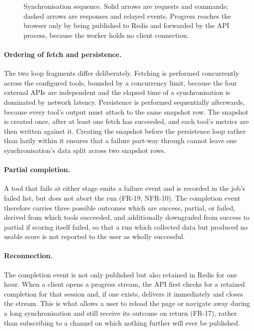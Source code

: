 \begin{figure}[htbp]
\caption{Synchronisation sequence. Solid arrows are requests and commands; dashed
arrows are responses and relayed events. Progress reaches the browser only by
being published to Redis and forwarded by the API process, because the worker
holds no client connection.}
\label{fig:sync-sequence}
\end{figure}

\paragraph{Ordering of fetch and persistence.}
The two loop fragments differ deliberately. Fetching is performed concurrently
across the configured tools, bounded by a concurrency limit, because the four
external APIs are independent and the elapsed time of a synchronisation is
dominated by network latency. Persistence is performed sequentially afterwards,
because every tool's output must attach to the same snapshot row. The snapshot is
created once, after at least one fetch has succeeded, and each tool's metrics are
then written against it. Creating the snapshot before the persistence loop rather
than lazily within it ensures that a failure part-way through cannot leave one
synchronisation's data split across two snapshot rows.

\paragraph{Partial completion.}
A tool that fails at either stage emits a failure event and is recorded in the
job's failed list, but does not abort the run (FR-19, NFR-10). The completion
event therefore carries three possible outcomes which are success, partial, or failed, 
derived from which tools succeeded, and additionally downgraded from success to partial 
if scoring itself failed, so that a run which collected data but
produced no usable score is not reported to the user as wholly successful.

\paragraph{Reconnection.}
The completion event is not only published but also retained in Redis for one
hour. When a client opens a progress stream, the API first checks for a retained
completion for that session and, if one exists, delivers it immediately and
closes the stream. This is what allows a user to reload the page or navigate away
during a long synchronisation and still receive its outcome on return (FR-17),
rather than subscribing to a channel on which nothing further will ever be
published.


